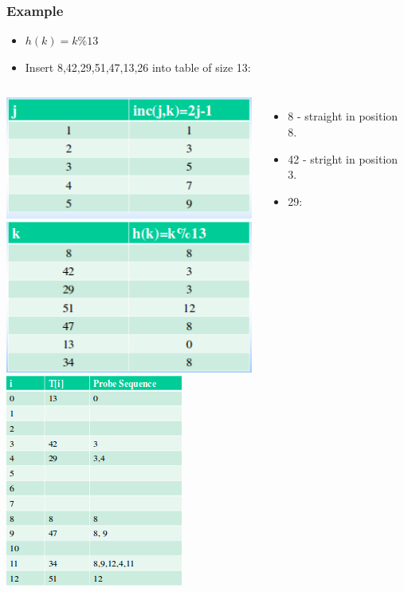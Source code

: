\documentclass{beamer}
\begin{document}
\begin{frame}
\frametitle{Example}
\begin{itemize}
\item $h(k) = k\%13$
\item Insert 8,42,29,51,47,13,26 into table of size 13:\\
\end{itemize}
\begin{columns}[t]
\includegraphics[scale=0.25]{j.png}\\
\includegraphics[scale=0.25]{k.png}\\
\includegraphics[scale=0.35]{final.png}
\vspace{-1cm}
{\tiny
\begin{itemize}
\item 8 - straight in position 8.
\item 42 - stright in position 3.
\item 29:

\end{itemize}}
\end{columns}
\end{frame}
\end{document}
